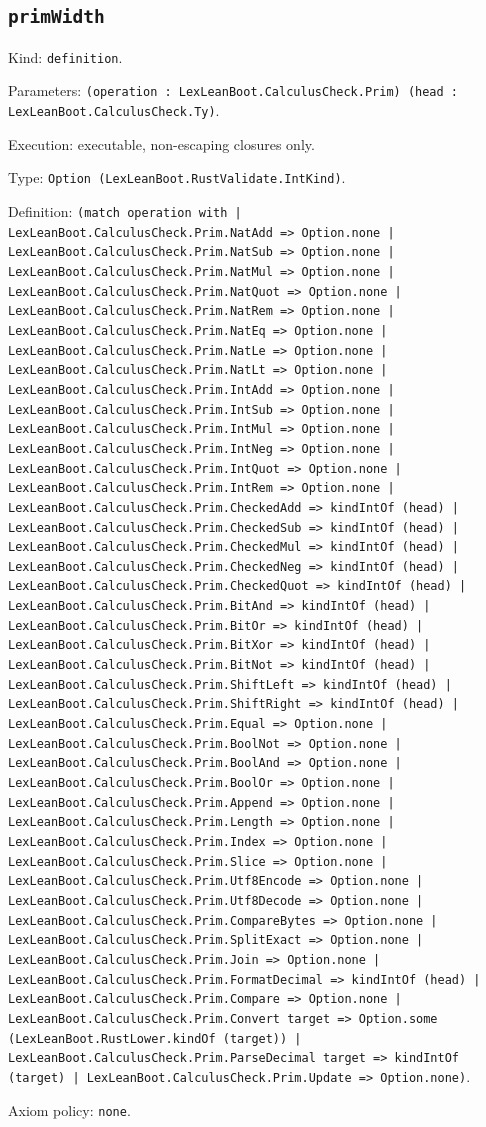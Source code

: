 \documentclass[11pt]{article}
\begin{document}
\subsection*{\texttt{primWidth}}
\noindent Kind: \texttt{definition}.\par
\noindent Parameters: \texttt{(operation : LexLeanBoot.CalculusCheck.Prim) (head : LexLeanBoot.CalculusCheck.Ty)}.\par
\noindent Execution: executable, non-escaping closures only.\par
\noindent Type: \texttt{Option (LexLeanBoot.RustValidate.IntKind)}.\par
\noindent Definition: \texttt{(match operation with | LexLeanBoot.CalculusCheck.Prim.NatAdd => Option.none | LexLeanBoot.CalculusCheck.Prim.NatSub => Option.none | LexLeanBoot.CalculusCheck.Prim.NatMul => Option.none | LexLeanBoot.CalculusCheck.Prim.NatQuot => Option.none | LexLeanBoot.CalculusCheck.Prim.NatRem => Option.none | LexLeanBoot.CalculusCheck.Prim.NatEq => Option.none | LexLeanBoot.CalculusCheck.Prim.NatLe => Option.none | LexLeanBoot.CalculusCheck.Prim.NatLt => Option.none | LexLeanBoot.CalculusCheck.Prim.IntAdd => Option.none | LexLeanBoot.CalculusCheck.Prim.IntSub => Option.none | LexLeanBoot.CalculusCheck.Prim.IntMul => Option.none | LexLeanBoot.CalculusCheck.Prim.IntNeg => Option.none | LexLeanBoot.CalculusCheck.Prim.IntQuot => Option.none | LexLeanBoot.CalculusCheck.Prim.IntRem => Option.none | LexLeanBoot.CalculusCheck.Prim.CheckedAdd => kindIntOf (head) | LexLeanBoot.CalculusCheck.Prim.CheckedSub => kindIntOf (head) | LexLeanBoot.CalculusCheck.Prim.CheckedMul => kindIntOf (head) | LexLeanBoot.CalculusCheck.Prim.CheckedNeg => kindIntOf (head) | LexLeanBoot.CalculusCheck.Prim.CheckedQuot => kindIntOf (head) | LexLeanBoot.CalculusCheck.Prim.BitAnd => kindIntOf (head) | LexLeanBoot.CalculusCheck.Prim.BitOr => kindIntOf (head) | LexLeanBoot.CalculusCheck.Prim.BitXor => kindIntOf (head) | LexLeanBoot.CalculusCheck.Prim.BitNot => kindIntOf (head) | LexLeanBoot.CalculusCheck.Prim.ShiftLeft => kindIntOf (head) | LexLeanBoot.CalculusCheck.Prim.ShiftRight => kindIntOf (head) | LexLeanBoot.CalculusCheck.Prim.Equal => Option.none | LexLeanBoot.CalculusCheck.Prim.BoolNot => Option.none | LexLeanBoot.CalculusCheck.Prim.BoolAnd => Option.none | LexLeanBoot.CalculusCheck.Prim.BoolOr => Option.none | LexLeanBoot.CalculusCheck.Prim.Append => Option.none | LexLeanBoot.CalculusCheck.Prim.Length => Option.none | LexLeanBoot.CalculusCheck.Prim.Index => Option.none | LexLeanBoot.CalculusCheck.Prim.Slice => Option.none | LexLeanBoot.CalculusCheck.Prim.Utf8Encode => Option.none | LexLeanBoot.CalculusCheck.Prim.Utf8Decode => Option.none | LexLeanBoot.CalculusCheck.Prim.CompareBytes => Option.none | LexLeanBoot.CalculusCheck.Prim.SplitExact => Option.none | LexLeanBoot.CalculusCheck.Prim.Join => Option.none | LexLeanBoot.CalculusCheck.Prim.FormatDecimal => kindIntOf (head) | LexLeanBoot.CalculusCheck.Prim.Compare => Option.none | LexLeanBoot.CalculusCheck.Prim.Convert target => Option.some (LexLeanBoot.RustLower.kindOf (target)) | LexLeanBoot.CalculusCheck.Prim.ParseDecimal target => kindIntOf (target) | LexLeanBoot.CalculusCheck.Prim.Update => Option.none)}.\par
\noindent Axiom policy: \texttt{none}.\par
\end{document}
